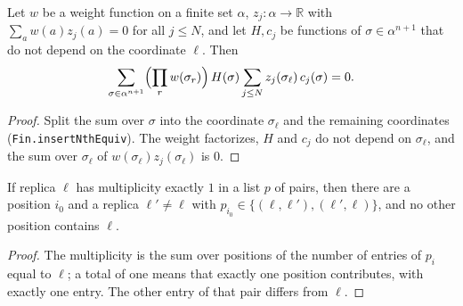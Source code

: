 \begin{lemma}
\label{lem:sg-tal:linear-vanishing}
  \leanok
{}
Let $w$ be a weight function on a finite set $\alpha$, $z_j:\alpha\to\mathbb R$ with $\sum_aw(a)z_j(a)=0$ for all $j\le N$, and let $H,c_j$ be functions of $\sigma\in\alpha^{n+1}$ that do not
depend on the coordinate $\ell$.  Then
\[
\sum_{\sigma\in\alpha^{n+1}}\Bigl(\prod_{r}w(\sigma_r)\Bigr)\,H(\sigma)\sum_{j\le N}z_j(\sigma_\ell)\,c_j(\sigma)=0 .
\]
\end{lemma}
\begin{proof}
  \leanok
Split the sum over $\sigma$ into the coordinate $\sigma_\ell$ and the remaining coordinates (\texttt{Fin.insertNthEquiv}).  The weight factorizes, $H$ and $c_j$ do not depend on $\sigma_\ell$, and the sum over $\sigma_\ell$
of $w(\sigma_\ell)z_j(\sigma_\ell)$ is $0$.
\end{proof}

\begin{lemma}
\label{lem:sg-tal:occurs-once}
  \leanok
{}
If replica $\ell$ has multiplicity exactly $1$ in a list $p$ of pairs, then there are a position $i_0$ and a replica $\ell'\ne\ell$ with $p_{i_0}\in\{(\ell,\ell'),(\ell',\ell)\}$, and
no other position contains $\ell$.
\end{lemma}
\begin{proof}
  \leanok
The multiplicity is the sum over positions of the number of entries of $p_i$ equal to $\ell$; a total of one means that exactly one position contributes, with exactly one entry.  The other entry
of that pair differs from $\ell$.
\end{proof}

